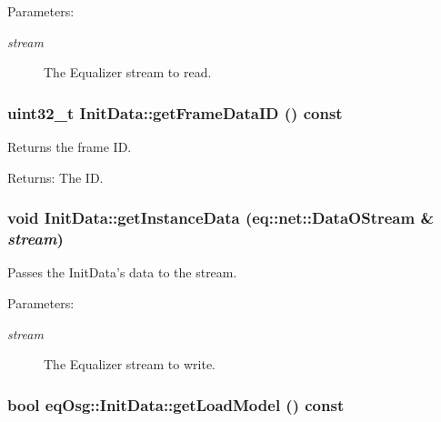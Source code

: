 \begin{Desc}
\item[Parameters:]
\begin{description}
\item[{\em stream}]The Equalizer stream to read. \end{description}
\end{Desc}
\hypertarget{a00011_0fed75d0be3cc9d30aa2483920dda8ec}{
\subsubsection[{getFrameDataID}]{\setlength{\rightskip}{0pt plus 5cm}uint32\_\-t InitData::getFrameDataID () const}}
\label{a00011_0fed75d0be3cc9d30aa2483920dda8ec}


Returns the frame ID. 

\begin{Desc}
\item[Returns:]The ID. \end{Desc}
\hypertarget{a00011_3604e3e7cc5b5c19f62bcf44d75d459f}{
\subsubsection[{getInstanceData}]{\setlength{\rightskip}{0pt plus 5cm}void InitData::getInstanceData (eq::net::DataOStream \& {\em stream})}}
\label{a00011_3604e3e7cc5b5c19f62bcf44d75d459f}


Passes the InitData's data to the stream. 

\begin{Desc}
\item[Parameters:]
\begin{description}
\item[{\em stream}]The Equalizer stream to write. \end{description}
\end{Desc}
\hypertarget{a00011_98db3359b5152eebe9967b0e4cf3e29a}{
\subsubsection[{getLoadModel}]{\setlength{\rightskip}{0pt plus 5cm}bool eqOsg::InitData::getLoadModel () const}}
\label{a00011_98db3359b5152eebe9967b0e4cf3e29a}


